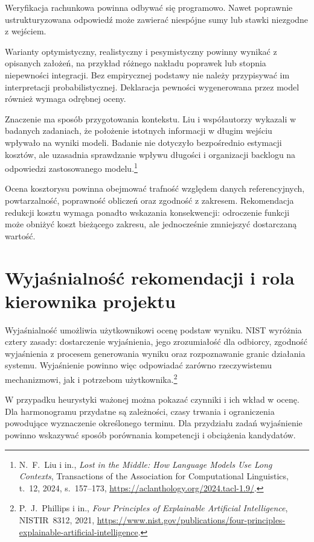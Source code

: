 Weryfikacja rachunkowa powinna odbywać się programowo. Nawet poprawnie ustrukturyzowana odpowiedź może zawierać niespójne sumy lub stawki niezgodne z wejściem.

Warianty optymistyczny, realistyczny i pesymistyczny powinny wynikać z opisanych założeń, na przykład różnego nakładu poprawek lub stopnia niepewności integracji. Bez empirycznej podstawy nie należy przypisywać im interpretacji probabilistycznej. Deklaracja pewności wygenerowana przez model również wymaga odrębnej oceny.

Znaczenie ma sposób przygotowania kontekstu. Liu i współautorzy wykazali w badanych zadaniach, że położenie istotnych informacji w długim wejściu wpływało na wyniki modeli. Badanie nie dotyczyło bezpośrednio estymacji kosztów, ale uzasadnia sprawdzanie wpływu długości i organizacji backlogu na odpowiedzi zastosowanego modelu.\footnote{N.~F.~Liu i in., \textit{Lost in the Middle: How Language Models Use Long Contexts}, Transactions of the Association for Computational Linguistics, t.~12, 2024, s.~157--173, \url{https://aclanthology.org/2024.tacl-1.9/}.}

Ocena kosztorysu powinna obejmować trafność względem danych referencyjnych, powtarzalność, poprawność obliczeń oraz zgodność z zakresem. Rekomendacja redukcji kosztu wymaga ponadto wskazania konsekwencji: odroczenie funkcji może obniżyć koszt bieżącego zakresu, ale jednocześnie zmniejszyć dostarczaną wartość.


\section{Wyjaśnialność rekomendacji i rola kierownika projektu}
\label{sec:wyjasnialnosc-rekomendacji}

Wyjaśnialność umożliwia użytkownikowi ocenę podstaw wyniku. NIST wyróżnia cztery zasady: dostarczenie wyjaśnienia, jego zrozumiałość dla odbiorcy, zgodność wyjaśnienia z procesem generowania wyniku oraz rozpoznawanie granic działania systemu. Wyjaśnienie powinno więc odpowiadać zarówno rzeczywistemu mechanizmowi, jak i potrzebom użytkownika.\footnote{P.~J.~Phillips i in., \textit{Four Principles of Explainable Artificial Intelligence}, NISTIR~8312, 2021, \url{https://www.nist.gov/publications/four-principles-explainable-artificial-intelligence}.}

W przypadku heurystyki ważonej można pokazać czynniki i ich wkład w ocenę. Dla harmonogramu przydatne są zależności, czasy trwania i ograniczenia powodujące wyznaczenie określonego terminu. Dla przydziału zadań wyjaśnienie powinno wskazywać sposób porównania kompetencji i obciążenia kandydatów.

